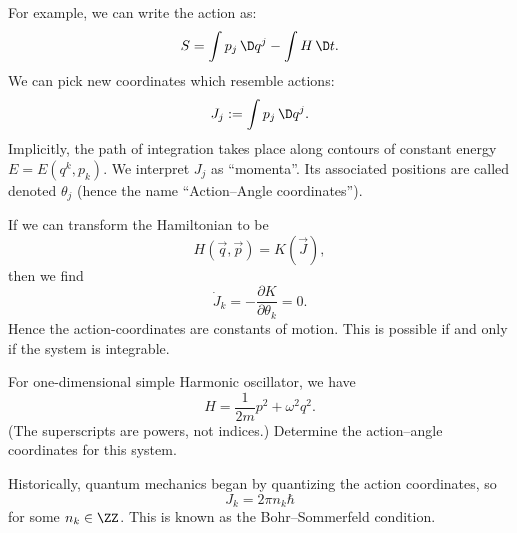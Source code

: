 For example, we can write the action as:
\begin{equation}
S = \int p_{j}\,\D q^{j} - \int H\,\D t.
\end{equation}
We can pick new coordinates which resemble actions:
\begin{equation}
J_{j} := \int p_{j}\,\D q^{j}.
\end{equation}
Implicitly, the path of integration takes place along contours of
constant energy $E=E(q^{k}, p_{k})$.
We interpret $J_{j}$ as ``momenta''. Its associated positions are called
 denoted $\theta_{j}$ (hence the name ``Action--Angle coordinates'').

If we can transform the Hamiltonian to be
\begin{equation}
H(\vec{q},\vec{p}) = K(\vec{J}),
\end{equation}
then we find
\begin{equation}
\dot{J}_{k} = -\frac{\partial K}{\partial\theta_{k}} = 0.
\end{equation}
Hence the action-coordinates are constants of motion. This is possible
if and only if the system is integrable.

\begin{exercise}
  For one-dimensional simple Harmonic oscillator, we have
  \begin{equation}
H = \frac{1}{2m}p^{2} + \omega^{2}q^{2}.
  \end{equation}
(The superscripts are powers, not indices.) Determine the action--angle
  coordinates for this system.
\end{exercise}

\begin{remark}
Historically, quantum mechanics began by quantizing the action
coordinates, so
\begin{equation}
J_{k} = 2\pi n_{k}\hbar
\end{equation}
for some $n_{k}\in\ZZ$. This is known as the Bohr--Sommerfeld condition.
\end{remark}
